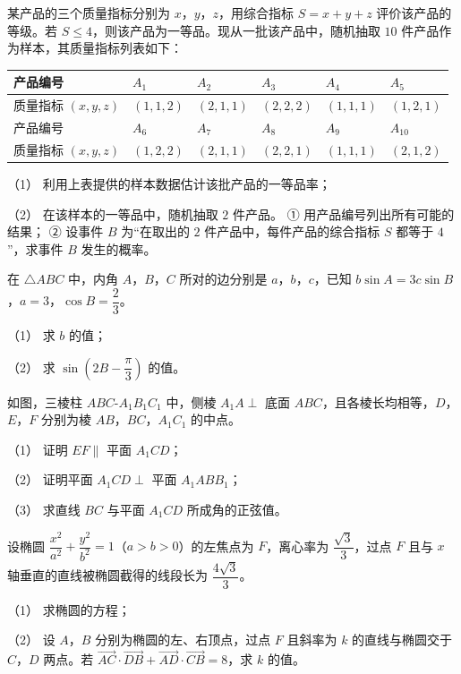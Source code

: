 \begin{question}
某产品的三个质量指标分别为 $x$，$y$，$z$，用综合指标 $S=x+y+z$ 评价该产品的等级。若 $S\leqslant4$，则该产品为一等品。现从一批该产品中，随机抽取 $10$ 件产品作为样本，其质量指标列表如下：

\begin{center}
\begin{tabular}{llllll}
\toprule
产品编号 & $A_1$ & $A_2$ & $A_3$ & $A_4$ & $A_5$ \\
\midrule
质量指标 $(x,y,z)$ & $(1,1,2)$ & $(2,1,1)$ & $(2,2,2)$ & $(1,1,1)$ & $(1,2,1)$ \\
产品编号 & $A_6$ & $A_7$ & $A_8$ & $A_9$ & $A_{10}$ \\
质量指标 $(x,y,z)$ & $(1,2,2)$ & $(2,1,1)$ & $(2,2,1)$ & $(1,1,1)$ & $(2,1,2)$ \\
\bottomrule
\end{tabular}
\end{center}

（1） 利用上表提供的样本数据估计该批产品的一等品率；

（2） 在该样本的一等品中，随机抽取 $2$ 件产品。
① 用产品编号列出所有可能的结果；
② 设事件 $B$ 为“在取出的 $2$ 件产品中，每件产品的综合指标 $S$ 都等于 $4$”，求事件 $B$ 发生的概率。

\end{question}
\begin{question}
在 $\triangle ABC$ 中，内角 $A$，$B$，$C$ 所对的边分别是 $a$，$b$，$c$，已知 $b\sin A=3c\sin B$，$a=3$，$\cos B=\dfrac23$。

（1） 求 $b$ 的值；

（2） 求 $\sin\left(2B-\dfrac\pi3\right)$ 的值。

\Needspace{0.4\textheight}
\end{question}
\begin{question}
如图，三棱柱 $ABC\text{-}A_1B_1C_1$ 中，侧棱 $A_1A\perp$ 底面 $ABC$，且各棱长均相等，$D$，$E$，$F$ 分别为棱 $AB$，$BC$，$A_1C_1$ 的中点。

（1） 证明 $EF\parallel$ 平面 $A_1CD$；

（2） 证明平面 $A_1CD\perp$ 平面 $A_1ABB_1$；

（3） 求直线 $BC$ 与平面 $A_1CD$ 所成角的正弦值。
\nopagebreak[4]
\begin{center}\end{center}
\nopagebreak[4]
\end{question}
\begin{question}
设椭圆 $\dfrac{x^2}{a^2}+\dfrac{y^2}{b^2}=1$（$a>b>0$）的左焦点为 $F$，离心率为 $\dfrac{\sqrt3}3$，过点 $F$ 且与 $x$ 轴垂直的直线被椭圆截得的线段长为 $\dfrac{4\sqrt3}3$。

（1） 求椭圆的方程；

（2） 设 $A$，$B$ 分别为椭圆的左、右顶点，过点 $F$ 且斜率为 $k$ 的直线与椭圆交于 $C$，$D$ 两点。若 $\overrightarrow{AC}\cdot\overrightarrow{DB}+\overrightarrow{AD}\cdot\overrightarrow{CB}=8$，求 $k$ 的值。

\end{question}
